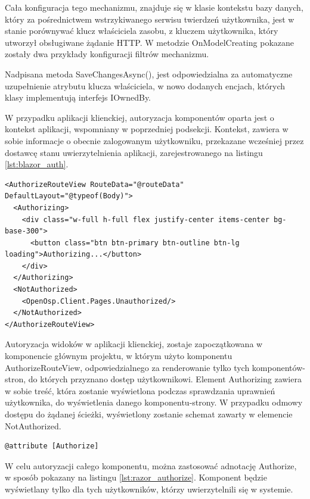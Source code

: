 Cała konfiguracja tego mechanizmu, znajduje się w klasie kontekstu bazy danych, który za pośrednictwem wstrzykiwanego serwisu twierdzeń użytkownika, jest w stanie porównywać klucz właściciela zasobu, z kluczem użytkownika, który utworzył obsługiwane żądanie HTTP. W metodzie OnModelCreating pokazane zostały dwa przykłady konfiguracji filtrów mechanizmu.

Nadpisana metoda SaveChangesAsync(), jest odpowiedzialna za automatyczne uzupełnienie atrybutu klucza właściciela, w nowo dodanych encjach, których klasy implementują interfejs IOwnedBy. 

W przypadku aplikacji klienckiej, autoryzacja komponentów oparta jest o kontekst aplikacji, wspomniany w poprzedniej podsekcji. Kontekst, zawiera w sobie informacje o obecnie zalogowanym użytkowniku, przekazane wcześniej przez dostawcę stanu uwierzytelnienia aplikacji, zarejestrowanego na listingu \ref{lst:blazor_auth}.

\begin{lstlisting}[language=CSharp, caption={Fragment głównego komponentu aplikacji klienckiej, odpowiadający za autoryzację widoków}, label=lst:authorizeRouteView]
<AuthorizeRouteView RouteData="@routeData" DefaultLayout="@typeof(Body)">
  <Authorizing>
    <div class="w-full h-full flex justify-center items-center bg-base-300">
      <button class="btn btn-primary btn-outline btn-lg loading">Authorizing...</button>
    </div>
  </Authorizing>
  <NotAuthorized>
    <OpenOsp.Client.Pages.Unauthorized/>
  </NotAuthorized>
</AuthorizeRouteView>
\end{lstlisting}

Autoryzacja widoków w aplikacji klienckiej, zostaje zapoczątkowana w komponencie głównym projektu, w którym użyto komponentu AuthorizeRouteView, odpowiedzialnego za renderowanie tylko tych komponentów-stron, do których przyznano dostęp użytkownikowi. Element Authorizing zawiera w sobie treść, która zostanie wyświetlona podczas sprawdzania uprawnień użytkownika, do wyświetlenia danego komponentu-strony. W przypadku odmowy dostępu do żądanej ścieżki, wyświetlony zostanie schemat zawarty w elemencie NotAuthorized.

\begin{lstlisting}[language=CSharp, caption={Zastosowanie adnotacji Authorize w komponentach Razor}, label=lst:razor_authorize]
@attribute [Authorize]
\end{lstlisting}

W celu autoryzacji całego komponentu, można zastosować adnotację Authorize, w sposób pokazany na listingu \ref{lst:razor_authorize}. Komponent będzie wyświetlany tylko dla tych użytkowników, którzy uwierzytelnili się w systemie.

